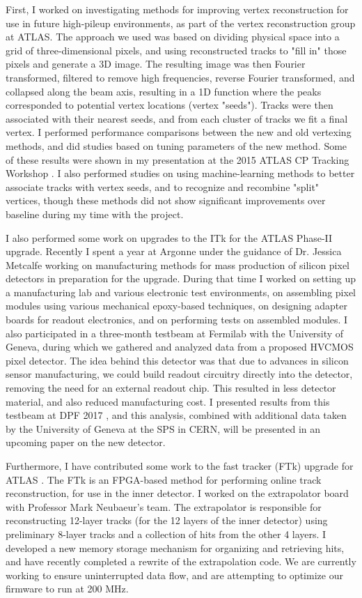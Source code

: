 First, I worked on investigating methods for improving vertex reconstruction for use in future high-pileup environments, as part of the vertex reconstruction group at ATLAS. The approach we used was based on dividing physical space into a grid of three-dimensional pixels, and using reconstructed tracks to "fill in" those pixels and generate a 3D image. The resulting image was then Fourier transformed, filtered to remove high frequencies, reverse Fourier transformed, and collapsed along the beam axis, resulting in a 1D function where the peaks corresponded to potential vertex locations (vertex "seeds"). Tracks were then associated with their nearest seeds, and from each cluster of tracks we fit a final vertex. I performed performance comparisons between the new and old vertexing methods, and did studies based on tuning parameters of the new method. Some of these results were shown in my presentation at the 2015 ATLAS CP Tracking Workshop \cite{vertex}. I also performed studies on using machine-learning methods to better associate tracks with vertex seeds, and to recognize and recombine "split" vertices, though these methods did not show significant improvements over baseline during my time with the project.

I also performed some work on upgrades to the ITk for the ATLAS Phase-II upgrade. Recently I spent a year at Argonne under the guidance of Dr. Jessica Metcalfe working on manufacturing methods for mass production of silicon pixel detectors in preparation for the upgrade. During that time I worked on setting up a manufacturing lab and various electronic test environments, on assembling pixel modules using various mechanical epoxy-based techniques, on designing adapter boards for readout electronics, and on performing tests on assembled modules. I also participated in a three-month testbeam at Fermilab with the University of Geneva, during which we gathered and analyzed data from a proposed HVCMOS pixel detector. The idea behind this detector was that due to advances in silicon sensor manufacturing, we could build readout circuitry directly into the detector, removing the need for an external readout chip. This resulted in less detector material, and also reduced manufacturing cost. I presented results from this testbeam at DPF 2017 \cite{DPF}, and this analysis, combined with additional data taken by the University of Geneva at the SPS in CERN, will be presented in an upcoming paper on the new detector.

Furthermore, I have contributed some work to the fast tracker (FTk) upgrade for ATLAS \cite{FTk}. The FTk is an FPGA-based method for performing online track reconstruction, for use in the inner detector. I worked on the extrapolator board with Professor Mark Neubaeur's team. The extrapolator is responsible for reconstructing 12-layer tracks (for the 12 layers of the inner detector) using preliminary 8-layer tracks and a collection of hits from the other 4 layers. I developed a new memory storage mechanism for organizing and retrieving hits, and have recently completed a rewrite of the extrapolation code. We are currently working to ensure uninterrupted data flow, and are attempting to optimize our firmware to run at 200 MHz.